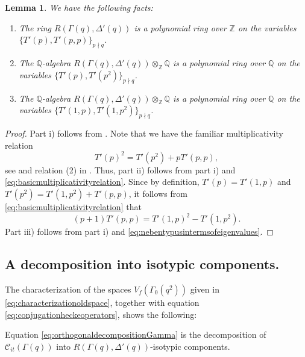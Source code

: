 \documentclass{article}
\newtheorem{lem}[thm]{Lemma}
\theoremstyle{named}
\newcommand{\C}{\mathcal{C}}
\newcommand{\Z}{\mathbb{Z}}
\newcommand{\Q}{\mathbb{Q}}
\begin{document}
\begin{lem}\label{lem:generatorsheckering}
We have the following facts:
\begin{enumerate}
    \item [i)] The ring $R(\Gamma(q), \Delta'(q))$ is a polynomial ring over $\Z$ on the variables $\{T'(p), T'(p, p)\}_{p \nmid q}$. 
    \item [ii)] The $\Q$-algebra $R(\Gamma(q), \Delta'(q)) \otimes_\Z \Q$ is a polynomial ring over $\Q$ on the variables $\{T'(p), T'(p^2)\}_{p \nmid q}$.   
    \item [iii)] The $\Q$-algebra $R(\Gamma(q), \Delta'(q)) \otimes_\Z \Q$ is a polynomial ring over $\Q$ on the variables $\{T'(1, p), T'(1, p^2)\}_{p \nmid q}$.   
\end{enumerate}
\end{lem}

\begin{proof}
Part i) follows from  \cite[Theorem 3.34]{shimurabook}. Note that we have the familiar multiplicativity relation 
\begin{equation}\label{eq:basicmultiplicativityrelation}
    T'(p)^2 = T'(p^2) + pT'(p, p),
\end{equation}
see \cite[Proposition 3.31]{shimurabook} and relation (2) in \cite[Theorem 3.24]{shimurabook}. Thus, part ii) follows from part i) and \eqref{eq:basicmultiplicativityrelation}. Since by definition, $T'(p) = T'(1, p)$ and $T'(p^2) = T'(1, p^2) + T'(p, p)$, it follows from \eqref{eq:basicmultiplicativityrelation} that 
\begin{equation}\label{eq:nebentypusintermsofeigenvalues}
    (p + 1)T'(p, p) = T'(1, p)^2 - T'(1, p^2).
\end{equation}
Part iii) follows from part i) and \eqref{eq:nebentypusintermsofeigenvalues}.
\end{proof}

\subsection{A decomposition into isotypic components.}

The characterization of the spaces $V_f(\Gamma_0(q^2))$ given in \eqref{eq:characterizationoldspace}, together with equation \eqref{eq:conjugationheckeoperators}, shows the following:
\begin{center} 
Equation \eqref{eq:orthogonaldecompositionGamma} is the decomposition of $\C_{it}(\Gamma(q))$ into $R(\Gamma(q), \Delta'(q))$-isotypic components. 
\end{center}
\end{document}
